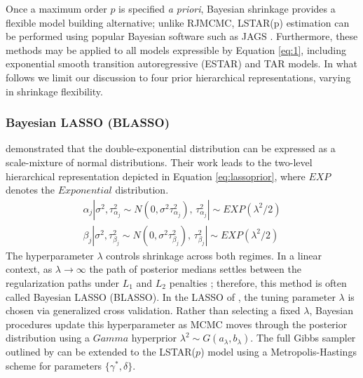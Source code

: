 Once a maximum order $p$ is specified \textit{a priori}, Bayesian shrinkage provides a flexible model building alternative; unlike RJMCMC, LSTAR(p) estimation can be performed using popular Bayesian software such as JAGS \citep{Plummer2003}. Furthermore, these methods may be applied to all models expressible by Equation \ref{eq:1}, including exponential smooth transition autoregressive (ESTAR) and TAR models. In what follows we limit our discussion to four prior hierarchical representations, varying in shrinkage flexibility.

\subsubsection{Bayesian LASSO (BLASSO)}
\cite{Andrews1974} demonstrated that the double-exponential distribution can be expressed as a scale-mixture of normal distributions. Their work leads to the two-level hierarchical representation depicted in Equation \ref{eq:lassoprior}, where $EXP$ denotes the $Exponential$ distribution.
\begin{equation}
	\label{eq:lassoprior}
	\begin{split}
	\alpha_j|\sigma^2,\tau^2_{\alpha_j} \sim N(0,\sigma^2\tau^2_{\alpha_j}) \textrm{,  }  \tau^2_{\alpha_j}| \sim EXP(\lambda^2/2)\\ 
	 \beta_j|\sigma^2,\tau^2_{\beta_j}\sim N(0,\sigma^2\tau^2_{\beta_j}) \textrm{,  } \tau^2_{\beta_j}| \sim EXP(\lambda^2/2)
	\end{split}
\end{equation}
The hyperparameter $\lambda$ controls shrinkage across both regimes. In a linear context, as $\lambda \to \infty$ the path of  posterior medians settles between the regularization paths under $L_1$ and $L_2$ penalties \citep{Park2008}; therefore, this method is often called Bayesian LASSO (BLASSO). In the LASSO of \cite{Tibshirani1996}, the tuning parameter $\lambda$ is chosen via generalized cross validation. Rather than selecting a fixed $\lambda$, Bayesian procedures update this hyperparameter as MCMC moves through the posterior distribution
\citep{George2000,Casella2001,Yuan2005} using a $Gamma$ hyperprior $\lambda^2 \sim G(a_\lambda,b_\lambda)$. The full Gibbs sampler outlined by \cite{Park2008} can be extended to the LSTAR($p$) model using a  Metropolis-Hastings scheme for parameters $\{\gamma^*, \delta\}$.

